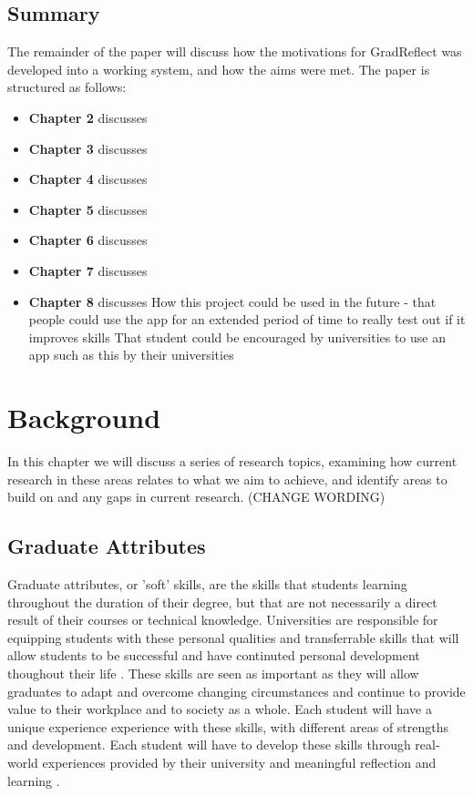 \documentclass{l4proj}
\begin{document}
\section{Summary}
The remainder of the paper will discuss how the motivations for GradReflect was developed
into a working system, and how the aims were met.
The paper is structured as follows:
\begin{itemize}
    \item
    \textbf{Chapter 2} discusses
    \item
    \textbf{Chapter 3} discusses
    \item
    \textbf{Chapter 4} discusses
    \item
    \textbf{Chapter 5} discusses
    \item
    \textbf{Chapter 6} discusses
    \item
    \textbf{Chapter 7} discusses
    \item
    \textbf{Chapter 8} discusses
    How this project could be used in the future - that people could use the app for an extended period of 
time to really test out if it improves skills
That student could be encouraged by universities to use an app such as this by their universities
\end{itemize}


\chapter{Background} \label{Background}

In this chapter we will discuss a series of research topics, examining how current research in these areas relates to what we aim 
to achieve, and identify areas to build on and any gaps in current research. (CHANGE WORDING)

\section{Graduate Attributes}

Graduate attributes, or 'soft' skills, are the skills that students learning throughout the duration of their degree, but that are not 
necessarily a direct result of their courses or technical knowledge. Universities are responsible for equipping students with these personal qualities and 
transferrable skills that will allow students to be successful and have continuted personal development thoughout their life 
\citep{stirling_graduate_nodate}. These skills are seen as important as they will allow graduates to adapt and overcome changing 
circumstances and continue to provide value to their workplace and to society as a whole. Each student will have a unique experience
experience with these skills, with different areas of strengths and development. Each student will have to develop these skills through
real-world experiences provided by their university and meaningful reflection and learning \citep{edinburgh_definition_skills}.
\end{document}
